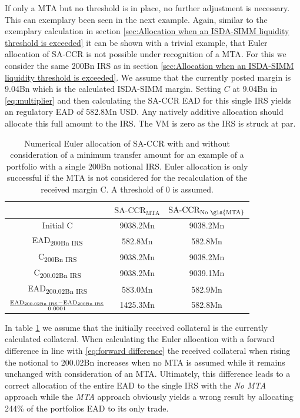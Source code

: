 \documentclass[../Thesis_AHoecherl.tex]{subfiles}
\begin{document}
    If only a MTA but no threshold is in place, no further adjustment is necessary.
    This can exemplary been seen in the next example.
    Again, similar to the exemplary calculation in section \ref{sec:Allocation when an ISDA-SIMM liquidity threshold is exceeded} it can be shown with a trivial example, that Euler allocation of SA-CCR is not possible under recognition of a \gls{MTA}. 
    For this we consider the same 200Bn \gls{IRS} as in section \ref{sec:Allocation when an ISDA-SIMM liquidity threshold is exceeded}. We assume that the currently posted margin is 9.04Bn which is the calculated ISDA-SIMM margin. 
    Setting $C$ at 9.04Bn in \ref{eq:multiplier} and then calculating the SA-CCR EAD for this single IRS  yields an regulatory EAD of 582.8Mn USD. Any natively additive allocation should allocate this full amount to the IRS.
    The \gls{VM} is zero as the IRS is struck at par.
    \begin{table}[htbp]
        \label{tab:Allocate SA-CCR with MTA calculation}
        \centering
        \begin{tabular}{c|c|c}
            & $\text{SA-CCR}_{\text{MTA}}$ & $\text{SA-CCR}_{\text{No \gls{MTA}}}$ \\
            \toprule
            Initial C & 9038.2Mn & 9038.2Mn \\
            \midrule
            EAD\textsubscript{200Bn IRS} & 582.8Mn & 582.8Mn \\
            \midrule
            C\textsubscript{200Bn IRS} & 9038.2Mn & 9038.2Mn \\
            \midrule
            C\textsubscript{200.02Bn IRS} & 9038.2Mn & 9039.1Mn \\
            \midrule
            EAD\textsubscript{200.02Bn IRS} & 583.0Mn & 582.9Mn \\
            \midrule
            $\frac{\text{EAD\textsubscript{200.02Bn IRS}}-\text{EAD\textsubscript{200Bn IRS}}}{0.0001}$ & 1425.3Mn & 582.8Mn  \\
        \end{tabular}%
        \caption{Numerical Euler allocation of SA-CCR with and without consideration of a minimum transfer amount for an example of a portfolio with a single 200Bn notional IRS. Euler allocation is only successful if the \gls{MTA} is not considered for the recalculation of the received margin C. A threshold of 0 is assumed.}
    \end{table}
    In table \ref{tab:Allocate SA-CCR with MTA calculation} we assume that the initially received collateral is the currently calculated collateral. 
    When calculating the Euler allocation with a forward difference in line with \ref{eq:forward difference} the received collateral when rising the notional to 200.02Bn increases when no MTA is assumed while it remains unchanged with consideration of an MTA. 
    Ultimately, this difference leads to a correct allocation of the entire EAD to the single IRS with the \emph{No MTA} approach while the \emph{MTA} approach obviously yields a wrong result by allocating 244\% of the portfolios EAD to its only trade.
    
\end{document}
